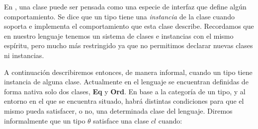 En \Haskell{}, una clase puede ser pensada como una especie de interfaz que define algún comportamiento.
Se dice que un tipo tiene una \textit{instancia} de la clase cuando soporta e implementa el comportamiento que esta clase describe.
Recordamos que en nuestro lenguaje tenemos un sistema de clases e instancias con el mismo espíritu, pero mucho más restringido ya que no permitimos declarar nuevas clases ni instancias.

A continuación describiremos entonces, de manera informal, cuando un tipo tiene instancia de alguna clase.
Actualmente en el lenguaje se encuentran definidas de forma nativa solo dos clases, \textbf{Eq} y \textbf{Ord}.
En base a la categoría de un tipo, y al entorno en el que se encuentra situado, habrá distintas condiciones para que el mismo pueda satisfacer, o no, una determinada clase del lenguaje.
Diremos informalmente que un tipo $\theta$ satisface una clase $cl$ cuando:

